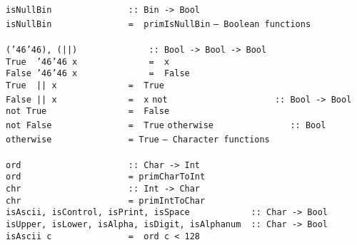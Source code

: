 %
\eprogB\noindent\bprogB
\mbox{\tt isNullBin\ \ \ \ \ \ \ \ \ \ \ \ \ \ \ ::\ Bin\ ->\ Bool}\\
\mbox{\tt isNullBin\ \ \ \ \ \ \ \ \ \ \ \ \ \ \ =\ \ primIsNullBin}
%
\eprogB\noindent\bprogB
\mbox{\tt --\ Boolean\ functions}\\
\mbox{\tt }\\
\mbox{\tt ({\char'46}{\char'46}),\ (||)\ \ \ \ \ \ \ \ \ \ \ \ \ \ ::\ Bool\ ->\ Bool\ ->\ Bool}\\
\mbox{\tt True\ \ {\char'46}{\char'46}\ x\ \ \ \ \ \ \ \ \ \ \ \ \ \ =\ \ x}\\
\mbox{\tt False\ {\char'46}{\char'46}\ x\ \ \ \ \ \ \ \ \ \ \ \ \ \ =\ \ False}\\
\mbox{\tt True\ \ ||\ x\ \ \ \ \ \ \ \ \ \ \ \ \ \ =\ \ True}\\
\mbox{\tt False\ ||\ x\ \ \ \ \ \ \ \ \ \ \ \ \ \ =\ \ x}
%
%
\eprogB\noindent\bprogB
\mbox{\tt not\ \ \ \ \ \ \ \ \ \ \ \ \ \ \ \ \ \ \ \ \ ::\ Bool\ ->\ Bool}\\
\mbox{\tt not\ True\ \ \ \ \ \ \ \ \ \ \ \ \ \ \ \ =\ \ False}\\
\mbox{\tt not\ False\ \ \ \ \ \ \ \ \ \ \ \ \ \ \ =\ \ True}
%
\eprogB\noindent\bprogB
\mbox{\tt otherwise\ \ \ \ \ \ \ \ \ \ \ \ \ \ \ ::\ Bool}\\
\mbox{\tt otherwise\ \ \ \ \ \ \ \ \ \ \ \ \ \ \ =\ True}
%
\eprogB\noindent\bprogB
\mbox{\tt --\ Character\ functions}\\
\mbox{\tt }\\
\mbox{\tt ord\ \ \ \ \ \ \ \ \ \ \ \ \ \ \ \ \ \ \ \ \ ::\ Char\ ->\ Int}\\
\mbox{\tt ord\ \ \ \ \ \ \ \ \ \ \ \ \ \ \ \ \ \ \ \ \ =\ primCharToInt}
%
\eprogB\noindent\bprogB
\mbox{\tt chr\ \ \ \ \ \ \ \ \ \ \ \ \ \ \ \ \ \ \ \ \ ::\ Int\ ->\ Char}\\
\mbox{\tt chr\ \ \ \ \ \ \ \ \ \ \ \ \ \ \ \ \ \ \ \ \ =\ primIntToChar}
%
\eprogB\noindent\bprogB
\mbox{\tt isAscii,\ isControl,\ isPrint,\ isSpace\ \ \ \ \ \ \ \ \ \ \ \ ::\ Char\ ->\ Bool}\\
\mbox{\tt isUpper,\ isLower,\ isAlpha,\ isDigit,\ isAlphanum\ \ ::\ Char\ ->\ Bool}
%
%
%
%
%
%
%
%
%
\eprogB\noindent\bprogB
\mbox{\tt isAscii\ c\ \ \ \ \ \ \ \ \ \ \ \ \ \ \ =\ \ ord\ c\ <\ 128}\\
